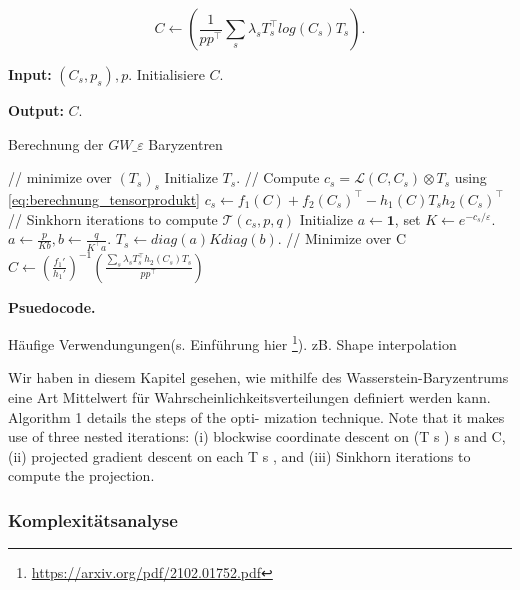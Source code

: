 \documentclass[11pt,a4paper]{article}
\numberwithin{equation}{section}
\begin{document}
	\begin{equation}
	C \leftarrow \left(\frac{1}{pp^\top}\sum_s{\lambda_s T_s^\top log(C_s)T_s}\right).
	\end{equation}
	\begin{algorithm}
		\hspace*{\algorithmicindent} \textbf{Input: } $(C_s,p_s), p.$ Initialisiere $C$. 
		
		\hspace*{\algorithmicindent} \textbf{Output: } $C$. 
		\caption{Berechnung der $GW\_{\varepsilon}$ Baryzentren}
		\label{alg:GWB_computation}
		\begin{algorithmic}
		\REPEAT 
			\STATE// minimize over $(T_s)_s$
				\STATE Initialize $T_s$.
				\REPEAT
				\STATE // Compute $c_s = \mathcal{L}(C,C_s)\otimes T_s$ using \autoref*{eq:berechnung_tensorprodukt}
				\STATE $c_s \leftarrow f_1(C) + f_2(C_s)^\top -h_1(C)T_sh_2(C_s)^\top$
				\STATE // Sinkhorn iterations to compute $\mathcal{T}(c_s,p,q)$
				\STATE Initialize $a \leftarrow \boldsymbol{1}$, set $K \leftarrow e^{-c_s/\varepsilon}.$
				\REPEAT 
				\STATE $a \leftarrow \frac{p}{Kb}, b \leftarrow  \frac{q}{K^\top a}.$
		 		\STATE $T_s \leftarrow diag(a)Kdiag(b).$
			\ENDFOR 
			\STATE // Minimize over C 
			\STATE $C \leftarrow \left( \frac{f_1'}{h_1'} \right)^{-1}\left( \frac{\sum_s{\lambda_sT_s^\top h_2(C_s)T_s}}{pp^\top} \right)$ 
		\end{algorithmic}
	\end{algorithm}
	
	\noindent \textbf{Psuedocode.}
	
	Häufige Verwendungungen(s. Einführung hier \footnote{\url{https://arxiv.org/pdf/2102.01752.pdf}}). zB. Shape interpolation
	
	Wir haben in diesem Kapitel gesehen, wie mithilfe des Wasserstein-Baryzentrums eine Art Mittelwert für Wahrscheinlichkeitsverteilungen definiert werden kann.\\
	Algorithm 1 details the steps of the opti-
	mization technique. Note that it makes use of three nested
	iterations: (i) blockwise coordinate descent on (T s ) s and
	C, (ii) projected gradient descent on each T s , and (iii)
	Sinkhorn iterations to compute the projection.
	\subsubsection{Komplexitätsanalyse}
	
\end{document}
